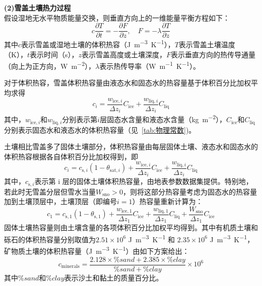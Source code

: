 \textbf {(2)雪盖土壤热力过程}\\

假设湿地无水平物质能量交换，则垂直方向上的一维能量平衡方程如下：
\begin{equation}\label{eq:WetlandThermalCons1}
  c \frac{\partial T}{\partial t}=-\frac{\partial F}{\partial z},  \quad F=-\lambda \frac{\partial T}{\partial z}
\end{equation}
其中$c$表示雪盖或湿地土壤的体积热容（\unit{J.m^{-3}.K^{-1}}），$T$表示雪盖土壤温度（K），$t$表示时间（s），$z$表示雪盖高度或土壤深度，$F$表示垂直方向的热传导通量（向上为正方向，\unit{W.m^{-2}}），$\lambda$表示热传导率（\unit{W.m^{-1}.K^{-1}}）。

对于体积热容，雪盖体积热容量由液态水和固态水的热容量基于体积百分比加权平均求得
\begin{equation}
  c_{i}=\frac{w_{\mathrm{ice},i}}{\Delta z_{i}} C_{\mathrm{ice}}+\frac{w_{\mathrm{liq},i}}{\Delta z_{i}} C_{\mathrm{liq}}
\end{equation}
其中，$w_{\mathrm{ice},i}$和$w_{\mathrm{liq},i}$分别表示第$i$层固态水含量和液态水含量（\unit{kg.m^{-2}}），$C_{\mathrm{ice}}$和$C_{\mathrm{liq}}$分别表示固态水和液态水的体积热容量（见~\ref{tab:物理常数})。

土壤相比雪盖多了固体土壤部分，体积热容量由每层固体土壤、液态水和固态水的体积热容根据各自体积百分比加权得到，即
\begin{equation}
  c_{i}=c_{\mathrm{s},i}\left(1-\theta_{\mathrm {sat},i}\right)+\frac{w_{\mathrm{ice},i}}{\Delta z_{i}} C_{\mathrm{ice}}+\frac{w_{\mathrm{liq},i}}{\Delta z_{i}} C_{\mathrm{liq}}
\end{equation}
其中，$c_{\mathrm{s},i}$表示第 i 层的固体土壤体积热容量，由地表参数数据集提供。特别地，若此时无雪盖分层但雪水当量$W_{\mathrm{sno}}>0$，则将这部分热容量考虑为固态水的热容量加到土壤顶层中，土壤顶层（即编号$i=1$）热容量重新计算为：
\begin{equation}
  c_{1}=c_{\mathrm{s,1}}\left(1-\theta_{\mathrm{s, 1}}\right)+\frac{w_{\mathrm{ice, 1}}}{\Delta z_{1}} C_{\mathrm{ice}}+\frac{w_{\mathrm{liq,1}}}{\Delta z_{1}} C_{\mathrm{liq}}+\frac{W_{\mathrm{sno}}}{\Delta z_{1}} C_{\mathrm{ice}}
\end{equation}
固体土壤热容量则由土壤含量的各项体积百分比加权平均得到。其中有机质土壤和砾石的体积热容量分别取值为$2.51 \times 10^{6}$ \unit{J.m^{−3}.K^{−1}} 和 $2.35 \times 10^{6}$ \unit{J.m^{−3}.K^{−1}}，矿物质土壤的体积热容量（\unit{J.m^{−3}.K^{−1}}）由如下方案给出：
\begin{equation}
  c_{\mathrm{minerals}}=\frac{2.128\times\%sand+2.385\times\%clay}{\%sand+\%clay}\times10^6
\end{equation}
其中$\%sand$和$\%clay$表示沙土和黏土的质量百分比。

